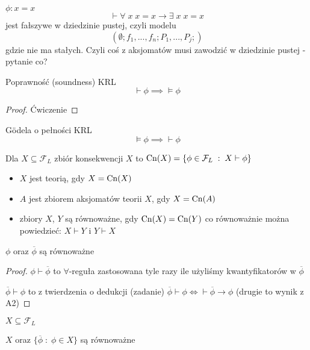 \begin{example}
  $\phi:x=x$
  $$\vdash\forall\;x\;x=x\to\exists\;x\;x=x$$
  jest fałszywe w dziedzinie pustej, czyli modelu
  $$(\emptyset; f_1,...,f_n; P_1,...,P_j;)$$
  gdzie nie ma stałych. Czyli coś z aksjomatów musi zawodzić w dziedzinie pustej - pytanie co?
\end{example}

\begin{center}
\end{center}

\begin{remark}{}{}
  Poprawność (soundness) KRL
  $$\vdash\phi\implies \models\phi$$
\end{remark}
\begin{proof}
  Ćwiczenie
\end{proof}

\begin{theorem}{G\"odela o pełności KRL}{}
  $$\models\phi\implies\vdash\phi$$
\end{theorem}

\begin{definition}{}{}
  Dla $X\subseteq\mathcal{F}_L$ zbiór konsekwencji $X$ to $\operatorname{Cn}(X)=\{\phi\in\mathcal{F}_L\;:\;X\vdash \phi\}$
  \begin{itemize}
    \item $X$ jest teorią, gdy $X=\operatorname{Cn}(X)$
    \item $A$ jest zbiorem aksjomatów teorii $X$, gdy $X=\operatorname{Cn}(A)$
    \item zbiory $X$, $Y$ są równoważne, gdy $\operatorname{Cn}(X)=\operatorname{Cn}(Y)$ co równoważnie można powiedzieć: $X\vdash Y$ i $Y\vdash X$
  \end{itemize}
\end{definition}

\begin{fact}{}{}
  $\phi$ oraz $\overline{\phi}$ są równoważne
\end{fact}
\begin{proof}
  $\phi\vdash\overline{\phi}$ to $\forall$-reguła zastosowana tyle razy ile użyliśmy kwantyfikatorów w $\overline{\phi}$

  $\overline{\phi}\vdash\phi$ to z twierdzenia o dedukcji (zadanie) $\overline{\phi}\vdash\phi\iff\vdash\overline{\phi}\to\phi$ (drugie to wynik z A2) 
\end{proof}

\begin{conclusion}{}{}
  $X\subseteq\mathcal{F}_L$

  $X$ oraz $\{\overline{\phi}\;:\;\phi\in X\}$ są równoważne
\end{conclusion}

